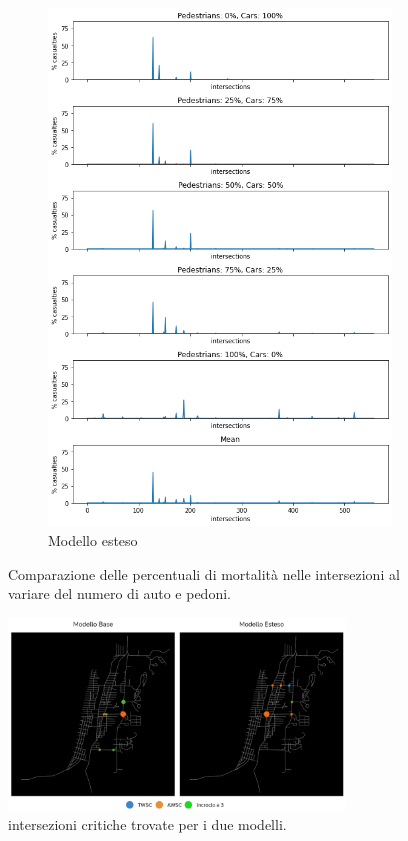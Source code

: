 \begin{figure}[p]
\begin{subfigure}{0.475\textwidth}
        \includegraphics[width=\textwidth]{images/analisi/comparison-critical-ints-new.png}
        \caption{Modello esteso}
        \label{fig:new-ints-casualties}
    \end{subfigure}
    \caption{Comparazione delle percentuali di mortalità nelle intersezioni al variare del numero di auto e pedoni.}
    \label{fig:analisi-comparison-critical-ints1}
\end{figure}

\begin{figure}[p]
    \centering
    \includegraphics[width=0.8\textwidth]{images/analisi/critical_ints_map.png}
    \caption{intersezioni critiche trovate per i due modelli.}
    \label{fig:analisi-comparison-critical-ints2}
\end{figure}

